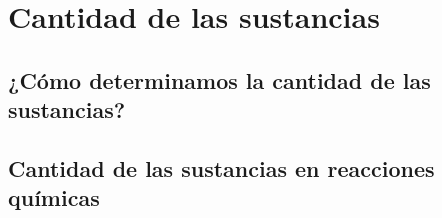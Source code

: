 \thispagestyle{plain}
\section{Cantidad de las sustancias}
\subsection{¿Cómo determinamos la cantidad de las sustancias?}
\subsection{Cantidad de las sustancias en reacciones químicas}
